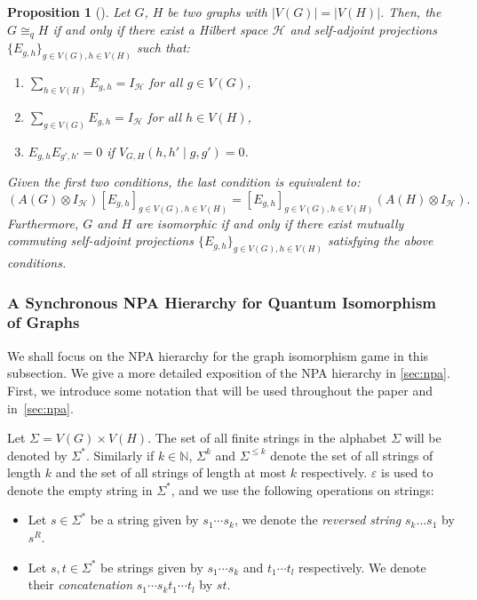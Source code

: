\documentclass[11pt,a4paper]{article}
\theoremstyle{plain}
\newtheorem{prop}[thm]{Proposition}
\theoremstyle{remark}
\theoremstyle{definition}
\newcommand{\card}[1]{\left\lvert #1 \right\rvert}
\renewcommand\epsilon\varepsilon
\begin{document}
\begin{prop}[\cite{ATSERIAS2019289}]\label{prop:perf-strat-graph}
    Let $G$, $H$ be two graphs with $\card{V(G)} = \card{V(H)}$. Then, the $G \cong_q H$ if and only if there exist a Hilbert space $\mathcal{H}$ and self-adjoint projections $\{E_{g,h}\}_{g \in V(G), h \in V(H)}$ such that: 
    \begin{enumerate}[label = \roman*.]
        \item $\sum_{h \in V(H)} E_{g,h} = I_{\mathcal{H}}$ for all $g \in V(G)$, 
        \item $\sum_{g \in V(G)} E_{g,h} = I_{\mathcal{H}}$ for all $h \in V(H)$, \item $E_{g,h} E_{g',h'} = 0$ if $V_{G,H}(h,h'\mid g,g') = 0$.
    \end{enumerate}
    Given the first two conditions, the last condition is equivalent to: 
    $$(A(G)\otimes I_{\mathcal{H}})[E_{g,h}]_{g \in V(G), h \in V(H)} = [E_{g,h}]_{g \in V(G), h \in V(H)}(A(H) \otimes I_\mathcal{H}).$$ Furthermore, $G$ and $H$ are isomorphic if and only if there exist mutually commuting self-adjoint projections $\{E_{g,h}\}_{g \in V(G), h \in V(H)}$ satisfying the above conditions.   
\end{prop}

\subsubsection{A Synchronous NPA Hierarchy for Quantum Isomorphism of Graphs}

We shall focus on the NPA hierarchy for the graph isomorphism game in this subsection. We give a more detailed exposition of the NPA hierarchy in \cref{sec:npa}. First, we introduce some notation that will be used throughout the paper and in~\cref{sec:npa}. 

Let $\Sigma = V(G) \times V(H)$. The set of all finite strings in the alphabet $\Sigma$ will be denoted by $\Sigma^*$. Similarly if $k \in \mathbb{N}$, $\Sigma^k$ and $\Sigma^{\leq k}$ denote the set of all strings of length $k$ and the set of all strings of length at most $k$ respectively. $\epsilon$ is used to denote the empty string in $\Sigma^*$, and we use the following operations on strings: 
\begin{itemize}
    \item Let $s \in \Sigma^*$ be a string given by $s_1\cdots s_k$, we denote the \emph{reversed string} $s_k\dots s_1$ by $s^R$. 
    \item Let $s,t \in \Sigma^*$ be strings given by $s_1\cdots s_k$ and $t_1\cdots t_l$ respectively. We denote their \emph{concatenation} $s_1\cdots s_k t_1 \cdots t_l$ by $st$.  
\end{itemize}
\end{document}
